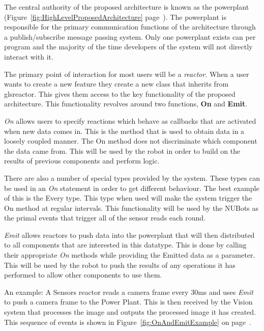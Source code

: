 \documentclass[english,12pt]{scrartcl}
\begin{document}
			The central authority of the proposed architecture is known as the \gls{powerplant} (Figure~\ref{fig:HighLevelProposedArchitecture} page~\pageref{fig:HighLevelProposedArchitecture}).
			The \gls{powerplant} is responsible for the primary communication functions of the architecture through a publish/subscribe message passing system.
			Only one \gls{powerplant} exists can per program and the majority of the time developers of the system will not directly interact with it.

			The primary point of interaction for most users will be a \emph{\gls{reactor}}.
			When a user wants to create a new feature they create a new class that inherits from gls{reactor}.
			This gives them access to the key functionality of the proposed architecture. This functionality revolves around two functions, \textbf{On} and \textbf{Emit}.
			
			\emph{On} allows users to specify \glspl{reaction} which behave as callbacks that are activated when new data comes in. This is the method that is used to obtain data in a loosely coupled manner. The On method does not discriminate which component the data came from. This will be used by the robot in order to build on the results of previous components and perform logic.
			
			There are also a number of special types provided by the system.
			These types can be used in an \emph{On} statement in order to get different behaviour.
			The best example of this is the Every type. This type when used will make the system trigger the On method at regular intervals.
			This functionality will be used by the NUBots as the primal events that trigger all of the sensor reads each round.
			
			\emph{Emit} allows \glspl{reactor} to push data into the \gls{powerplant} that will then distributed to all components that are interested in this datatype. This is done by calling their appropriate \emph{On} methods while providing the Emitted data as a parameter.
			This will be used by the robot to push the results of any operations it has performed to allow other components to use them.
			
			An example: A Sensors reactor reads a camera frame every 30ms and uses \emph{Emit} to push a camera frame to the Power Plant. This is then received by the Vision system that processes the image and outputs the processed image it has created. This sequence of events is shown in Figure~\ref{fig:OnAndEmitExample} on page~\pageref{fig:OnAndEmitExample}.
			
\end{document}

